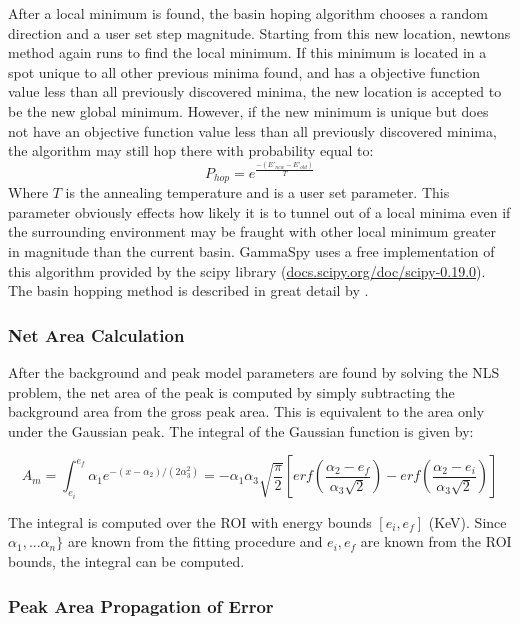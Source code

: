 \documentclass[10pt]{article}
\begin{document}
After a local minimum is found, the basin hoping algorithm chooses a random
direction and a user set step magnitude.  Starting from this new location,
newtons method again runs to find the local minimum.  If this minimum is located in a spot
unique to all other previous minima found, and has a objective function value less than
all previously discovered minima, the new location is accepted to be the new global minimum.
However, if the new minimum is unique but does not have an objective function value
less than all previously discovered minima, the algorithm may still hop there with
probability equal to:
\begin{equation}
    P_{hop} = e^{\frac{-(E'_{new} - E'_{old})}{T}}
\end{equation}
Where $T$ is the annealing temperature and is a user set parameter.  This parameter obviously
effects how likely it is to tunnel out of a local minima even if the surrounding environment may
be fraught with other local minimum greater in magnitude than the current basin.
GammaSpy uses a free implementation of this algorithm provided by the scipy library (\url{docs.scipy.org/doc/scipy-0.19.0}).
The basin hopping method is described in great detail by \cite{Wales:1997}.

\subsubsection{Net Area Calculation}

After the background and peak model parameters are found by solving the NLS problem,
the net area of the peak is computed by simply subtracting the background area from
the gross peak area.  This is equivalent to the area only under the Gaussian peak.
The integral of the Gaussian function is given by:

\begin{equation}
    A_m = \int_{e_i}^{e_f} \alpha_1 e^{-(x-\alpha_2)/(2\alpha_3^2)}= -\alpha_1 \alpha_3 \sqrt{\frac{\pi}{2}}
    \left[erf\left(\frac{\alpha_2 - e_f}{\alpha_3\sqrt2}\right)  - erf\left(\frac{\alpha_2 - e_i}{\alpha_3\sqrt2}\right)\right]
    \label{model_net_area}
\end{equation}

The integral is computed over the ROI with energy bounds $[e_i, e_f]$ (KeV).  Since
$\alpha_1, ... \alpha_n\}$ are known from the fitting procedure and $e_i, e_f$ are known from the ROI bounds,
the integral can be computed.

\subsubsection{Peak Area Propagation of Error}
\end{document}
